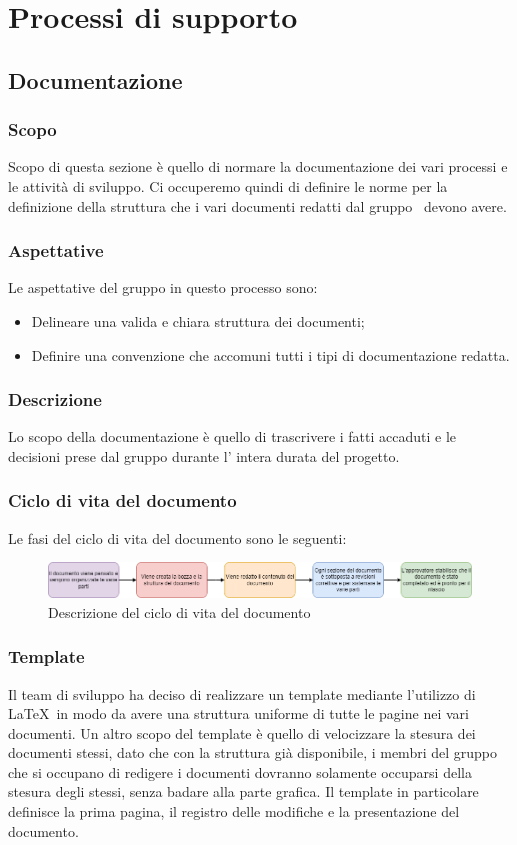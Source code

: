 \section{Processi di supporto}\label{section:processi_supporto}
\subsection{Documentazione}\label{subsection: documentazione}
\subsubsection{Scopo}\label{subsubsection: scopo}
Scopo di questa sezione è quello di normare la documentazione dei vari processi e le attività di sviluppo.
Ci occuperemo quindi di definire le norme per la definizione della struttura che i vari documenti redatti dal gruppo \groupName\ devono avere.
\subsubsection{Aspettative}
Le aspettative del gruppo \groupName{} in questo processo sono:
\begin{itemize}
    \item Delineare una valida e chiara struttura dei documenti;
    \item Definire una convenzione che accomuni tutti i tipi di documentazione redatta.
 \end {itemize}
\subsubsection{Descrizione}
Lo scopo della documentazione è quello di trascrivere i fatti accaduti e le decisioni prese dal gruppo durante l' intera durata del progetto.
\subsubsection{Ciclo di vita del documento}
Le fasi del ciclo di vita del documento sono le seguenti:
      \begin{figure}[htbp]
         \centering 
         \includegraphics[scale = 0.5]{../template/images/NdP/CicloDiVitaDocumento.png}
         \caption{Descrizione del ciclo di vita del documento}
      \end {figure}
\subsubsection{Template}
Il team di sviluppo ha deciso di realizzare un template mediante l'utilizzo di \LaTeX\ in modo da avere una struttura uniforme di tutte le pagine nei vari documenti.
Un altro scopo del template è quello di velocizzare la stesura dei documenti stessi, dato che con la struttura già disponibile, i membri del gruppo che si occupano di redigere i documenti dovranno solamente occuparsi della stesura degli stessi, senza badare alla parte grafica.
Il template in particolare definisce la prima pagina, il registro delle modifiche e la presentazione del documento.
